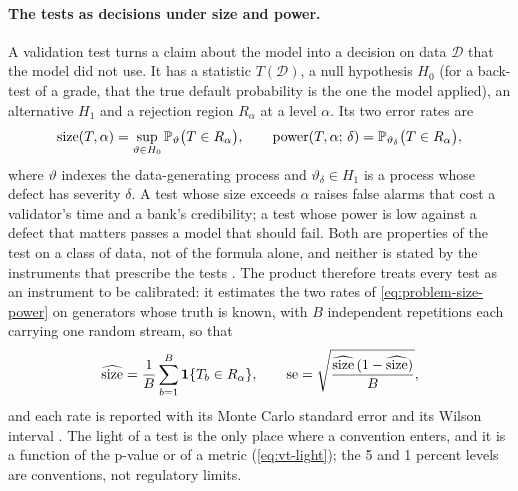 \paragraph{The tests as decisions under size and power.} A validation test turns a claim about the model into a decision on data $\mathcal D$ that the
model did not use. It has a statistic $T(\mathcal D)$, a null hypothesis $H_0$ (for a back-test of a grade, that the true default probability is the
one the model applied), an alternative $H_1$ and a rejection region $R_\alpha$ at a level $\alpha$. Its two error rates are
\begin{equation}
  \operatorname{size}(T,\alpha)=\sup_{\vartheta\in H_0}\mathbb{P}_\vartheta\bigl(T\in R_\alpha\bigr),\qquad
  \operatorname{power}(T,\alpha;\,\delta)=\mathbb{P}_{\vartheta_\delta}\bigl(T\in R_\alpha\bigr),
  \label{eq:problem-size-power}
\end{equation}
where $\vartheta$ indexes the data-generating process and $\vartheta_\delta\in H_1$ is a process whose defect has severity $\delta$. A test whose size exceeds
$\alpha$ raises false alarms that cost a validator's time and a bank's credibility; a test whose power is low against a defect that matters passes a model that
should fail. Both are properties of the test on a class of data, not of the formula alone, and neither is stated by the instruments that prescribe the tests
\citep{credit-scoring:ecb2019,credit-scoring:bcbswp14}. The product therefore treats every test as an instrument to be calibrated: it estimates the two rates of
\cref{eq:problem-size-power} on generators whose truth is known, with $B$ independent repetitions each carrying one random stream, so that
\begin{equation}
  \widehat{\operatorname{size}}=\frac{1}{B}\sum_{b=1}^{B}\mathbf{1}\{T_b\in R_\alpha\},\qquad
  \operatorname{se}=\sqrt{\frac{\widehat{\operatorname{size}}\,(1-\widehat{\operatorname{size}})}{B}},
  \label{eq:problem-mc}
\end{equation}
and each rate is reported with its Monte Carlo standard error \citep{alm:morris2019} and its Wilson interval \citep{ratings:brown2001}. The light of a test is the
only place where a convention enters, and it is a function of the p-value or of a metric (\cref{eq:vt-light}); the 5 and 1 percent levels are conventions, not
regulatory limits.

